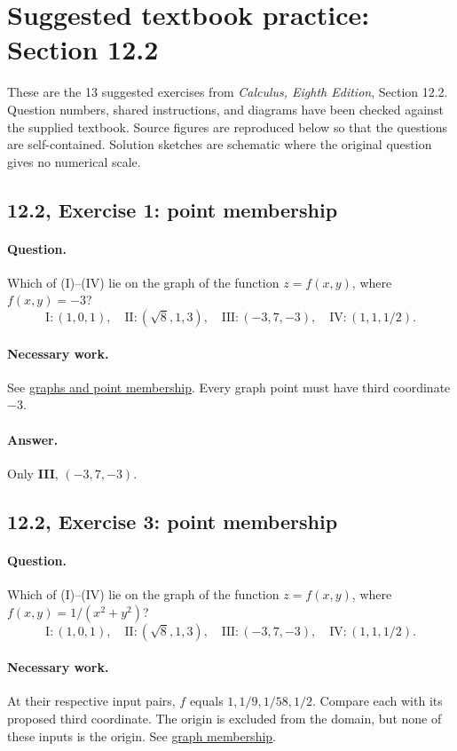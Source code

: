 \section{Suggested textbook practice: Section 12.2}\label{textbook}
These are the 13 suggested exercises from \emph{Calculus, Eighth Edition}, Section 12.2. Question numbers, shared instructions, and diagrams have been checked against the supplied textbook. Source figures are reproduced below so that the questions are self-contained. Solution sketches are schematic where the original question gives no numerical scale.

\subsection{12.2, Exercise 1: point membership}
\paragraph{Question.} Which of (I)--(IV) lie on the graph of the function $z=f(x,y)$, where $f(x,y)=-3$?
\[
\mathrm{I}:(1,0,1),\quad \mathrm{II}:(\sqrt8,1,3),\quad
\mathrm{III}:(-3,7,-3),\quad \mathrm{IV}:(1,1,1/2).
\]
\paragraph{Necessary work.} See \hyperref[graph]{graphs and point membership}. Every graph point must have third coordinate $-3$.
\paragraph{Answer.} Only \textbf{III}, $(-3,7,-3)$.

\subsection{12.2, Exercise 3: point membership}
\paragraph{Question.} Which of (I)--(IV) lie on the graph of the function $z=f(x,y)$, where $f(x,y)=1/(x^2+y^2)$?
\[
\mathrm{I}:(1,0,1),\quad \mathrm{II}:(\sqrt8,1,3),\quad
\mathrm{III}:(-3,7,-3),\quad \mathrm{IV}:(1,1,1/2).
\]
\paragraph{Necessary work.} At their respective input pairs, $f$ equals $1,1/9,1/58,1/2$. Compare each with its proposed third coordinate. The origin is excluded from the domain, but none of these inputs is the origin. See \hyperref[graph]{graph membership}.
